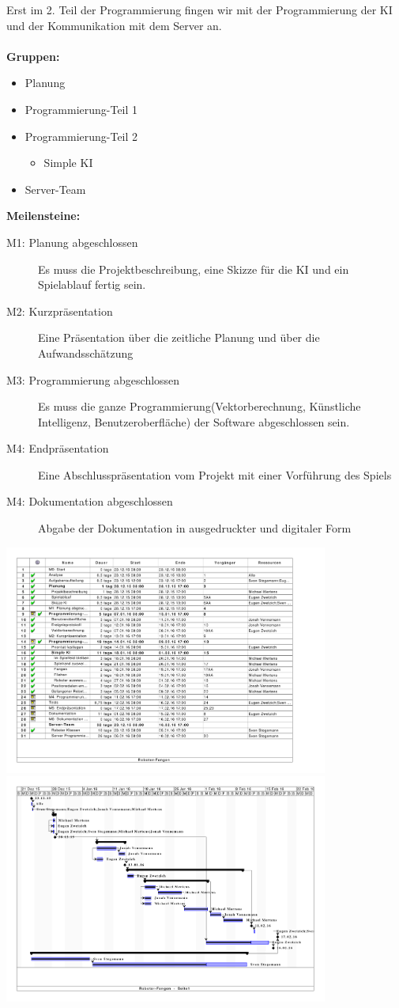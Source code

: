 Erst im 2. Teil der Programmierung fingen wir mit der Programmierung der KI und der Kommunikation mit dem Server an.
\\\\
\textbf{Gruppen:} 
\begin{itemize}
	\item Planung
	\item Programmierung-Teil 1
	\item Programmierung-Teil 2
	\begin{itemize}
		\item Simple KI
	\end{itemize}
	\item Server-Team\\
\end{itemize} 
\textbf{Meilensteine:}
\begin{description}
	\item[M1: Planung abgeschlossen] Es muss die Projektbeschreibung, eine Skizze für die KI und ein Spielablauf fertig sein.
	\item[M2: Kurzpräsentation] Eine Präsentation über die zeitliche Planung und über die Aufwandsschätzung
	\item[M3: Programmierung abgeschlossen] Es muss die ganze Programmierung(Vektorberechnung, Künstliche Intelligenz, Benutzeroberfläche) der Software abgeschlossen sein. 
	\item[M4: Endpräsentation] Eine Abschlusspräsentation vom Projekt mit einer Vorführung des Spiels
	\item[M4: Dokumentation abgeschlossen] Abgabe der Dokumentation in ausgedruckter und digitaler Form
\end{description}

\begin{center}
	\includegraphics[width=0.8\textwidth]{Bilder/Roboter-Fangen_Liste.pdf}
	\includegraphics[width=0.8\textwidth]{Bilder/Roboter-Fangen_Grafik.pdf}
\end{center}
\newpage